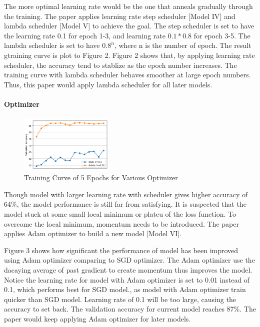 \documentclass[10pt]{article}
\begin{document}
The more optimal learning rate would be the one that anneals gradually through the training. The paper applies learning rate step scheduler [Model IV] and lambda scheduler [Model V] to achieve the goal. The step scheduler is set to have the learning rate 0.1 for epoch 1-3, and learning rate \(0.1*0.8\) for epoch 3-5. The lambda scheduler is set to have \(0.8 ^ n\), where n is the number of epoch. The result gtraining curve is plot to Figure 2. Figure 2 shows that, by applying learning rate scheduler, the accuracy tend to stablize as the epoch number increases. The training curve with lambda scheduler behaves smoother at large epoch numbers. Thus, this paper would apply lambda scheduler for all later models.

 
\paragraph{Optimizer}
\begin{figure} 

   \includegraphics[width=0.4\textwidth,right]{plot3}
   \caption{Training Curve of 5 Epochs for Various Optimizer}

\end{figure} 
Though model with larger learning rate with scheduler gives higher accuracy of 64\%, the model performance is still far from satisfying. It is suspected that the model stuck at some small local minimum or plateu of the loss function. To overcome the local minimum, momentum 
needs to be introduced. The paper applies Adam optimizer to build a new model [Model VI]. \par
Figure 3 shows how significant the performance of model has been improved using Adam optimizer comparing to SGD optimizer. The Adam optimizer use the dacaying average of past gradient to create momentum thus improves the model. Notice the learning rate for model with Adam optimizer is set to 0.01 instead of 0.1, which performs best for SGD model., as model with Adam optimizer train quicker than SGD model. Learning rate of 0.1 will be too large, causing the accuracy to set back. The validation accuracy for current model reaches 87\%. The paper would keep applying Adam optimizer for later models.
\end{document}
